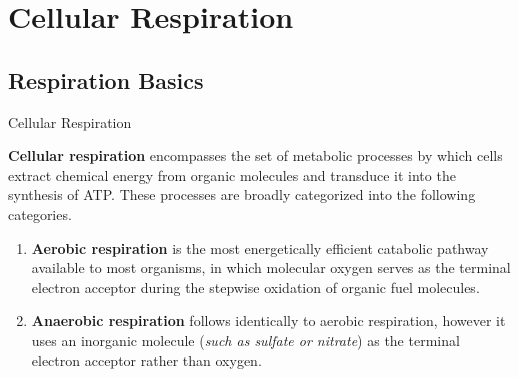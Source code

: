 \documentclass[10pt]{article}
\begin{document}
\section{Cellular Respiration}

  \subsection{Respiration Basics}

    \begin{core}[label=core:cell_respiration]{Cellular Respiration}

      \textbf{Cellular respiration} encompasses the set of metabolic processes by which cells extract chemical energy from organic molecules and transduce it into the synthesis of ATP. These processes are broadly categorized into the following categories.

      \begin{enumerate}

        \item \textbf{Aerobic respiration} is the most energetically efficient catabolic pathway available to most organisms, in which molecular oxygen serves as the terminal electron acceptor during the stepwise oxidation of organic fuel molecules.


        \item \textbf{Anaerobic respiration} follows identically to aerobic respiration, however it uses an inorganic molecule (\textit{such as sulfate or nitrate}) as the terminal electron acceptor rather than oxygen.


      \end{enumerate}

    \end{core}
\end{document}
